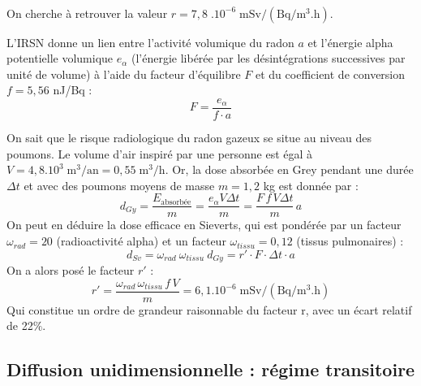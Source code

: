\documentclass{article}
\begin{document}
\paragraph{} On cherche à retrouver la valeur $r=7,8 \; .10^{-6} \;\text{m}\text{Sv}/(\text{Bq}/\text{m}^3.\text{h})$.

L’IRSN donne un lien \cite{irsn_ineris_radon_nodate} entre l’activité volumique du radon $a$ et l’énergie alpha potentielle volumique $e_{\alpha}$ (l’énergie libérée par les désintégrations successives par unité de volume) à l’aide du facteur d’équilibre $F$ et du coefficient de conversion $f=5,56$ nJ/Bq :
$$
F=\frac{e_{\alpha}}{f\cdot a}
$$

On sait que le risque radiologique du radon gazeux se situe au niveau des poumons. Le volume d’air inspiré par une personne est égal à $V=4,8.10^3 \;  \text{m}^3/\text{an}=0,55 \; \text{m}^3/\text{h} $. Or, la dose absorbée en Grey pendant une durée $\Delta t$ et avec des poumons moyens de masse $m=1,2$ kg est donnée par : 
$$
d_{Gy}=\frac{E_{\text{absorbée}}}{m}=\frac{e_{\alpha} V \Delta t}{m}=\frac{F\,f\,V\Delta t}{m}\,a
$$
On peut en déduire la dose efficace en Sieverts, qui est pondérée par un facteur $\omega_{rad}=20$ (radioactivité alpha) et un facteur $\omega_{tissu}=0,12$ (tissus pulmonaires) :
$$
d_{Sv}=\omega_{rad}\: \omega_{tissu} \: d_{Gy} = r'\cdot F\cdot\Delta t\cdot a
$$
On a alors posé le facteur $r'$ :
$$
r'= \frac{\omega_{rad}\, \omega_{tissu}\,  f\,V}{m}=6,1.10^{-6} \; \text{m}\text{Sv}/(\text{Bq}/\text{m}^3.\text{h})
$$
Qui constitue un ordre de grandeur raisonnable du facteur r, avec un écart relatif de 22$\%$.

\subsection{Diffusion unidimensionnelle : régime transitoire}
\end{document}
